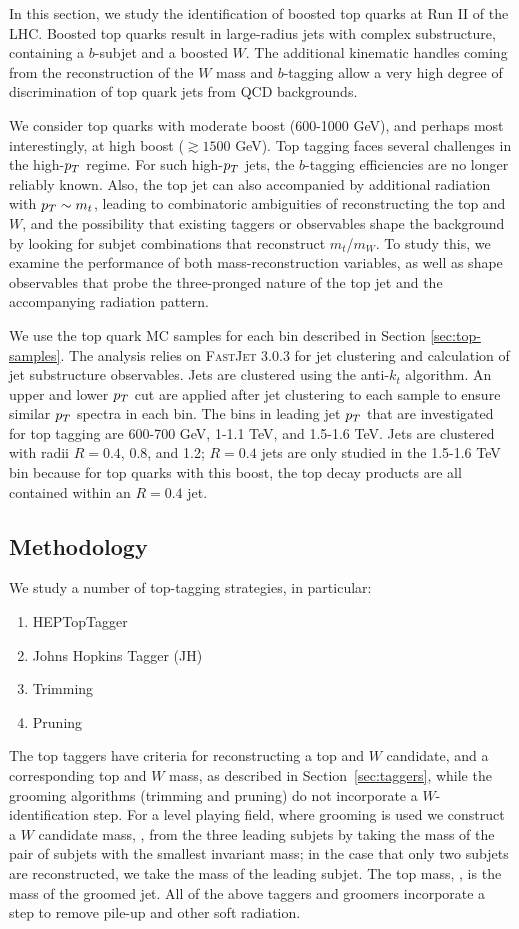 In this section, we study the identification of boosted top quarks at Run II of the LHC. Boosted top quarks result in large-radius jets with complex substructure, containing a $b$-subjet and a boosted $W$. The additional kinematic handles coming from the reconstruction of the $W$ mass and $b$-tagging allow a very high degree of discrimination of top quark jets from QCD backgrounds. 

We consider top quarks with moderate boost (600-1000 GeV), and perhaps most interestingly, at high boost ($\gtrsim1500$ GeV). Top tagging faces several challenges in the high-$p_T$ regime. For such high-$p_T$ jets, the $b$-tagging efficiencies are no longer reliably known. Also, the top jet can also accompanied by additional radiation with $p_T\sim m_t$, leading to combinatoric ambiguities of reconstructing the top and $W$, and the possibility that existing taggers or observables shape the background by looking for subjet combinations that reconstruct $m_t$/$m_W$. To study this, we examine the performance of both mass-reconstruction variables, as well as shape observables that probe the three-pronged nature of the top jet and the accompanying radiation pattern.

We use the top quark MC samples for each bin described in Section \ref{sec:top-samples}. The analysis  relies on \textsc{FastJet} 3.0.3 for jet clustering and
calculation of jet substructure observables. Jets are clustered using the anti-$k_t$ algorithm. An upper and lower $p_T$ cut are applied after jet clustering
to each sample to ensure similar $p_T$ spectra in each bin. The bins in leading jet $p_T$
that are investigated for top tagging are 600-700 GeV, 1-1.1 TeV, and
1.5-1.6 TeV. Jets are clustered with radii $R=0.4$, 0.8, and 1.2; $R=0.4$ jets are only studied in the 1.5-1.6 TeV bin
because for top quarks with this boost, the top decay products are all contained within an $R=0.4$ jet.

\subsection{Methodology}\label{sec:topmethod}
We study a number of top-tagging strategies, in particular:
%
\begin{enumerate}
\item HEPTopTagger
\item Johns Hopkins Tagger (JH)
\item Trimming
\item Pruning
\end{enumerate}
%
The top taggers have criteria for reconstructing a top and $W$ candidate, and a corresponding top and $W$ mass, as described in Section~\ref{sec:taggers}, while the grooming algorithms (trimming and pruning) do not incorporate a $W$-identification step. For a level playing field, where grooming is used we construct a $W$ candidate mass, \wmass, from the three leading subjets by taking the mass of the pair of subjets with the smallest invariant mass; in the case that only two subjets are reconstructed, we take the mass of the leading subjet. The top mass, \topmass, is the mass of the groomed jet. All of the above taggers and groomers incorporate a step to remove pile-up and other soft radiation.

